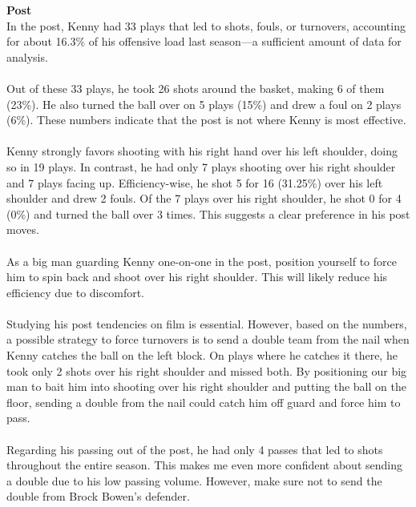 \documentclass[a4paper,12pt]{article}
\begin{document}
\begin{multicols}{2}
    {\large \noindent \textbf{Post}} \\ 
    In the post, Kenny had 33 plays that led to shots, fouls, or turnovers, accounting for about 16.3\% of his offensive load last season—a sufficient amount of data for analysis.\\ \\
    Out of these 33 plays, he took 26 shots around the basket, making 6 of them (23\%). He also turned the ball over on 5 plays (15\%) and drew a foul on 2 plays (6\%). These numbers indicate that the post is not where Kenny is most effective.\\ \\
    Kenny strongly favors shooting with his right hand over his left shoulder, doing so in 19 plays. In contrast, he had only 7 plays shooting over his right shoulder and 7 plays facing up. Efficiency-wise, he shot 5 for 16 (31.25\%) over his left shoulder and drew 2 fouls. Of the 7 plays over his right shoulder, he shot 0 for 4 (0\%) and turned the ball over 3 times. This suggests a clear preference in his post moves.\\ \\
    As a big man guarding Kenny one-on-one in the post, position yourself to force him to spin back and shoot over his right shoulder. This will likely reduce his efficiency due to discomfort.\\ \\
    Studying his post tendencies on film is essential. However, based on the numbers, a possible strategy to force turnovers is to send a double team from the nail when Kenny catches the ball on the left block. On plays where he catches it there, he took only 2 shots over his right shoulder and missed both. By positioning our big man to bait him into shooting over his right shoulder and putting the ball on the floor, sending a double from the nail could catch him off guard and force him to pass.\\ \\
    Regarding his passing out of the post, he had only 4 passes that led to shots throughout the entire season. This makes me even more confident about sending a double due to his low passing volume. However, make sure not to send the double from Brock Bowen's defender. \\ \\


\end{multicols}
\end{document}
